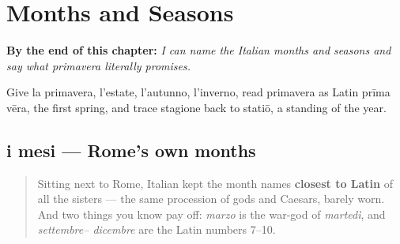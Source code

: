 
\chapter{Months and Seasons}
\label{ch:it-months-and-seasons}

\begin{chapteropening}
\textbf{By the end of this chapter:} \emph{I can name the Italian months and seasons and say what primavera literally promises.}

Give la primavera, l'estate, l'autunno, l'inverno, read primavera as Latin prīma vēra, the first spring, and trace stagione back to statiō, a standing of the year.
\end{chapteropening}

\section[i mesi]{i mesi — Rome's own months}

\label{lesson:IT-C09-mesi}



\begin{quote}
Sitting next to Rome, Italian kept the month names \textbf{closest to Latin} of all the sisters — the same procession of gods and Caesars, barely worn. And two things you know pay off: \emph{marzo} is the war-god of \emph{martedì}, and \emph{settembre– dicembre} are the Latin numbers 7–10.
\end{quote}

